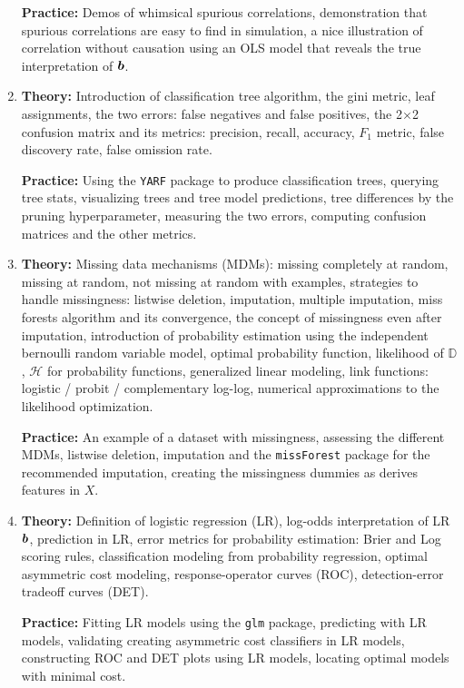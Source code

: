 \documentclass[12pt]{article}
\begin{document}
\begin{enumerate}[(1)]
\textbf{Practice:} Demos of whimsical spurious correlations, demonstration that spurious correlations are easy to find in simulation, a nice illustration of correlation without causation using an OLS model that reveals the true interpretation of $\boldsymbol{b}$.

\item \textbf{Theory:} Introduction of classification tree algorithm, the gini metric, leaf assignments, the two errors: false negatives and false positives, the 2$\times$2 confusion matrix and its metrics: precision, recall, accuracy, $F_1$ metric, false discovery rate, false omission rate.

\textbf{Practice:} Using the \texttt{YARF} package to produce classification trees, querying tree stats, visualizing trees and tree model predictions, tree differences by the pruning hyperparameter, measuring the two errors, computing confusion matrices and the other metrics.

\item \textbf{Theory:} Missing data mechanisms (MDMs): missing completely at random, missing at random, not missing at random with examples, strategies to handle missingness: listwise deletion, imputation, multiple imputation, miss forests algorithm and its convergence, the concept of  missingness even after imputation, introduction of probability estimation using the independent bernoulli random variable model, optimal probability function, likelihood of $\mathbb{D}$, $\mathcal{H}$ for probability functions, generalized linear modeling, link functions: logistic / probit / complementary log-log, numerical approximations to the likelihood optimization.

\textbf{Practice:} An example of a dataset with missingness, assessing the different MDMs, listwise deletion, imputation and the \texttt{missForest} package for the recommended imputation, creating the missingness dummies as derives features in $X$.

\item \textbf{Theory:} Definition of logistic regression (LR), log-odds interpretation of LR $\boldsymbol{b}$, prediction in LR, error metrics for probability estimation: Brier and Log scoring rules, classification modeling from probability regression, optimal asymmetric cost modeling, response-operator curves (ROC), detection-error tradeoff curves (DET).

\textbf{Practice:} Fitting LR models using the \texttt{glm} package, predicting with LR models, validating creating asymmetric cost classifiers in LR models, constructing ROC and DET plots using LR models, locating optimal models with minimal cost. 
\end{enumerate}
\end{document}
